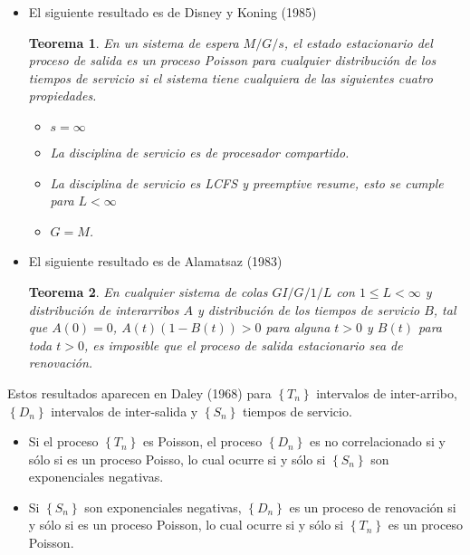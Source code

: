 \documentclass{article}
\newtheorem{Teo}{Teorema}[section]
\numberwithin{equation}{section}
\begin{document}
{\begin{itemize}
\item El siguiente resultado es de Disney y Koning (1985)
\begin{Teo}
En un sistema de espera $M/G/s$, el estado estacionario del proceso de salida es un proceso Poisson para cualquier distribuci\'on de los tiempos de servicio si el sistema tiene cualquiera de las siguientes cuatro propiedades.

\begin{itemize}
\item[a)] $s=\infty$
\item[b)] La disciplina de servicio es de procesador compartido.
\item[c)] La disciplina de servicio es LCFS y preemptive resume, esto se cumple para $L<\infty$
\item[d)] $G=M$.
\end{itemize}

\end{Teo}

\item El siguiente resultado es de Alamatsaz (1983)

\begin{Teo}
En cualquier sistema de colas $GI/G/1/L$ con $1\leq L<\infty$ y distribuci\'on de interarribos $A$ y distribuci\'on de los tiempos de servicio $B$, tal que $A\left(0\right)=0$, $A\left(t\right)\left(1-B\left(t\right)\right)>0$ para alguna $t>0$ y $B\left(t\right)$ para toda $t>0$, es imposible que el proceso de salida estacionario sea de renovaci\'on.
\end{Teo}

\end{itemize}

Estos resultados aparecen en Daley (1968) \cite{Daley68} para $\left\{T_{n}\right\}$ intervalos de inter-arribo, $\left\{D_{n}\right\}$ intervalos de inter-salida y $\left\{S_{n}\right\}$ tiempos de servicio.

\begin{itemize}
\item Si el proceso $\left\{T_{n}\right\}$ es Poisson, el proceso $\left\{D_{n}\right\}$ es no correlacionado si y s\'olo si es un proceso Poisso, lo cual ocurre si y s\'olo si $\left\{S_{n}\right\}$ son exponenciales negativas.

\item Si $\left\{S_{n}\right\}$ son exponenciales negativas, $\left\{D_{n}\right\}$ es un proceso de renovaci\'on  si y s\'olo si es un proceso Poisson, lo cual ocurre si y s\'olo si $\left\{T_{n}\right\}$ es un proceso Poisson.


\end{itemize}}
\end{document}
